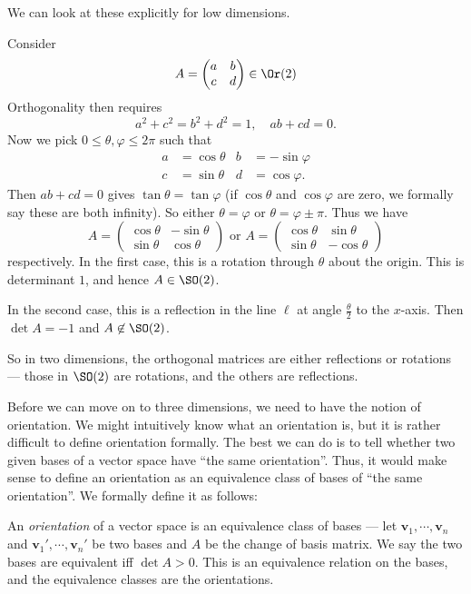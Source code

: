 \documentclass[a4paper]{article}
\begin{document}
We can look at these explicitly for low dimensions.
\begin{eg}
  Consider
  \[
    A =
    \begin{pmatrix}
      a & b\\
      c & d
    \end{pmatrix} \in \Or(2)
  \]
  Orthogonality then requires
  \[
    a^2 + c^2 = b^2 + d^2 = 1,\quad ab + cd = 0.
  \]
  Now we pick $0 \leq \theta, \varphi \leq 2\pi$ such that
  \begin{align*}
    a &= \cos \theta & b &= -\sin \varphi\\
    c &= \sin \theta & d &= \cos \varphi.
  \end{align*}
  Then $ab + cd = 0$ gives $\tan \theta = \tan \varphi$ (if $\cos \theta$ and $\cos \varphi$ are zero, we formally say these are both infinity). So either $\theta = \varphi$ or $\theta = \varphi \pm \pi$. Thus we have
  \[
    A=
    \begin{pmatrix}
      \cos \theta & -\sin \theta\\
      \sin \theta & \cos \theta
    \end{pmatrix}\text{ or }
    A =
    \begin{pmatrix}
      \cos \theta & \sin \theta\\
      \sin \theta & -\cos \theta
    \end{pmatrix}
  \]
  respectively. In the first case, this is a rotation through $\theta$ about the origin. This is determinant $1$, and hence $A \in \SO(2)$.

  In the second case, this is a reflection in the line $\ell$ at angle $\frac{\theta}{2}$ to the $x$-axis. Then $\det A = -1$ and $A \not\in \SO(2)$.

  So in two dimensions, the orthogonal matrices are either reflections or rotations --- those in $\SO(2)$ are rotations, and the others are reflections.
\end{eg}
Before we can move on to three dimensions, we need to have the notion of orientation. We might intuitively know what an orientation is, but it is rather difficult to define orientation formally. The best we can do is to tell whether two given bases of a vector space have ``the same orientation''. Thus, it would make sense to define an orientation as an equivalence class of bases of ``the same orientation''. We formally define it as follows:
\begin{defi}[Orientation]
  An \emph{orientation} of a vector space is an equivalence class of bases --- let $\mathbf{v}_1, \cdots, \mathbf{v}_n$ and $\mathbf{v}_1', \cdots, \mathbf{v}_n'$ be two bases and $A$ be the change of basis matrix. We say the two bases are equivalent iff $\det A > 0$. This is an equivalence relation on the bases, and the equivalence classes are the orientations.
\end{defi}
\end{document}
